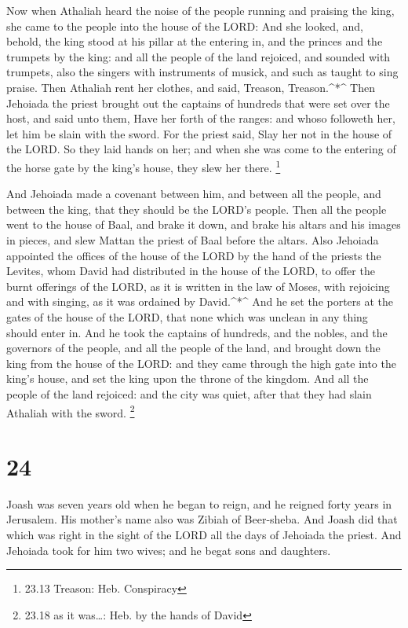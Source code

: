  Now when Athaliah heard the noise of the people running
and praising the king, she came to the people into the house of the
LORD:  And she looked, and, behold, the king stood at his
pillar at the entering in, and the princes and the trumpets by the king:
and all the people of the land rejoiced, and sounded with trumpets, also
the singers with instruments of musick, and such as taught to sing
praise. Then Athaliah rent her clothes, and said, Treason,
Treason.\^{}*\^{}  Then Jehoiada the priest brought out the
captains of hundreds that were set over the host, and said unto them,
Have her forth of the ranges: and whoso followeth her, let him be slain
with the sword. For the priest said, Slay her not in the house of the
LORD.  So they laid hands on her; and when she was come to
the entering of the horse gate by the king's house, they slew her there.
\footnote{23.13 Treason: Heb. Conspiracy}

 And Jehoiada made a covenant between him, and between all
the people, and between the king, that they should be the LORD's people.
 Then all the people went to the house of Baal, and brake
it down, and brake his altars and his images in pieces, and slew Mattan
the priest of Baal before the altars.  Also Jehoiada
appointed the offices of the house of the LORD by the hand of the
priests the Levites, whom David had distributed in the house of the
LORD, to offer the burnt offerings of the LORD, as it is written in the
law of Moses, with rejoicing and with singing, as it was ordained by
David.\^{}*\^{}  And he set the porters at the gates of the
house of the LORD, that none which was unclean in any thing should enter
in.  And he took the captains of hundreds, and the nobles,
and the governors of the people, and all the people of the land, and
brought down the king from the house of the LORD: and they came through
the high gate into the king's house, and set the king upon the throne of
the kingdom.  And all the people of the land rejoiced: and
the city was quiet, after that they had slain Athaliah with the sword.
\footnote{23.18 as it was\ldots: Heb. by the hands of David}

\hypertarget{section-23}{%
\section{24}\label{section-23}}

 Joash was seven years old when he began to reign, and he
reigned forty years in Jerusalem. His mother's name also was Zibiah of
Beer-sheba.  And Joash did that which was right in the sight
of the LORD all the days of Jehoiada the priest.  And
Jehoiada took for him two wives; and he begat sons and daughters.

